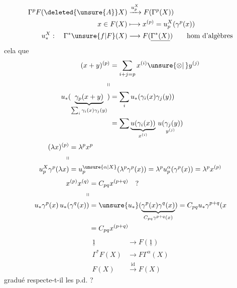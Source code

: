 \[
\begin{aligned}
\Gamma^p F(\deleted{\unsure{A}}X)&\xrightarrow{u_p^X} F(\Gamma^p(X))\\
x\in F(X)&\longmapsto x^{(p)}=u_p^X(\gamma^p(x))\\
u_*^X:\quad\Gamma^* \unsure{f|F}(X)&\longrightarrow F(\underline{\Gamma^*(X)})\qquad\text{hom d'algèbres}
\end{aligned}
\]
cela  que
\[
\begin{aligned}
(x+y)^{(p)}&=\sum_{i+j=p}x^{(i)}\unsure{\otimes|\,} y^{(j)}\\
\shortparallel\\
u_*(\underbrace{\gamma_p(x+y)}_{\sum_i\gamma_i(x)\gamma_j(y)})&=\sum_i u_*(\gamma_i(x)\gamma_j(y))\\
&=\sum \underbrace{u(\gamma_i(x))}_{x^{(i)}}\,\underset{y^{(j)}}{u(\gamma_j(y))}
\end{aligned}
\]
\[
\begin{aligned}
(\lambda x)^{(p)}&=\lambda^p x^p\\
\shortparallel\\
u_p^X\gamma^p(\lambda x)&=u_p^{\unsure{\alpha|X}}(\lambda^p\gamma^p(x))=\lambda^p u_p^\alpha(\gamma^p(x))=\lambda^p x^{(p)}
\end{aligned}
\]
\[
\begin{aligned}
x^{(p)}x^{(q)}&=C_{pq}x^{(p+q)}\quad ?\\
\shortparallel\\
u_*\gamma^p(x)\,u_*(\gamma^q(x))&=\unsure{u_*}(\underbrace{\gamma^p(x)\gamma^q(x)}_{C_{pq}\gamma^{p+q}(x)})=C_{pq}u_*\gamma^{p+q}(x\\
&=C_{pq}x^{(p+q)}
\end{aligned}
\]
\[
\begin{aligned}
\underline{1}&\longrightarrow F(\underline{1})\\
\Gamma^* F(X)&\longrightarrow F\Gamma^{\alpha}(X)\\
F(X)&\xrightarrow{\mathrm{id}} F(X)
\end{aligned}
\]
 gradué respecte-t-il les p.d. ?

